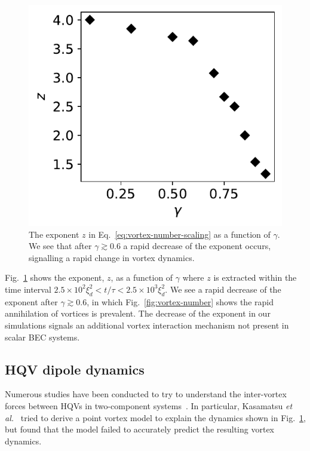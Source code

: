 \begin{figure}[t!]
    \centering
    \includegraphics{gfx/ch-twoCompDynamics/gamma_vs_expo.pdf}
    \caption[Critical exponent as a function of \(\gamma\)]
    {The exponent \( z \) in Eq.~\eqref{eq:vortex-number-scaling} as a
        function of \(\gamma \).
        We see that after \(\gamma \gtrsim 0.6\) a rapid decrease of the exponent
        occurs, signalling a rapid change in vortex
        dynamics.\label{fig:exponent-vs-gamma}}
\end{figure}
Fig.~\ref{fig:exponent-vs-gamma} shows the exponent, \( z \), as a function of
\(\gamma \) where \( z \) is extracted within the time interval
\(2.5 \times 10^2\xi_d^2 < t/\tau < 2.5\times10^3\xi_d^2\).
We see a rapid decrease of the exponent after \(\gamma \gtrsim 0.6\), in which
Fig.~\ref{fig:vortex-number} shows the rapid annihilation of vortices is
prevalent.
The decrease of the exponent in our simulations signals an additional vortex
interaction mechanism not present in scalar BEC systems.

\subsection{HQV dipole dynamics}
Numerous studies have been conducted to try to understand the inter-vortex
forces between HQVs in two-component systems~\cite{Eto2011, Kasamatsu2016}.
In particular, Kasamatsu \textit{et al.}~\cite{Kasamatsu2016} tried to derive a
point vortex model to explain the dynamics shown in
Fig.~\ref{fig:exponent-vs-gamma}, but found that the model failed to accurately
predict the resulting vortex dynamics.


